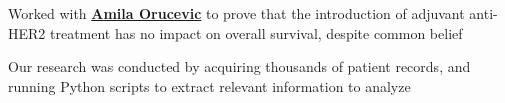 \documentclass[letterpaper]{deedy-resume} %
\begin{document}
\begin{minipage}[t]{0.66\textwidth}

  \begin{tightitemize}
  \item Worked with \textbf{\href{http://gsm.utmck.edu/pathology/faculty/orucevic.cfm}{Amila Orucevic}} to prove that the introduction of adjuvant anti-HER2 treatment has no impact on overall survival, despite common belief
  \item Our research was conducted by acquiring thousands of patient records, and running Python scripts to extract relevant information to analyze
  \end{tightitemize}

  \sectionspace %

\end{minipage} %
\end{document}
